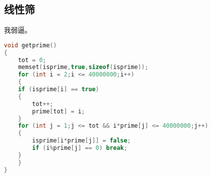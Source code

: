 \subsection{线性筛}
    我弱逼。\\
    \begin{lstlisting}[language=c++]
void getprime()
{
    tot = 0;
    memset(isprime,true,sizeof(isprime));
    for (int i = 2;i <= 40000000;i++)
    {
	if (isprime[i] == true)
	{
	    tot++;
	    prime[tot] = i;
	}
	for (int j = 1;j <= tot && i*prime[j] <= 40000000;j++)
	{
	    isprime[i*prime[j]] = false;
	    if (i%prime[j] == 0) break;
	}
    }
}
    \end{lstlisting}